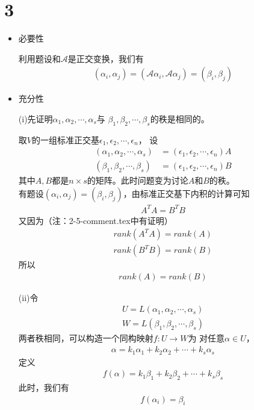\documentclass{article}
\begin{document}
\section*{3}

\begin{itemize}
  \item 必要性

        利用题设和$\mathscr{A}$是正交变换，我们有
        \begin{align*}
          (\alpha_i, \alpha_j) = (\mathscr{A} \alpha_i, \mathscr{A} \alpha_j) = (\beta_i, \beta_j)
        \end{align*}

  \item 充分性

        (i)先证明$\alpha_1, \alpha_2, \cdots, \alpha_s$与
        $\beta_1, \beta_2, \cdots, \beta_s$的秩是相同的。

        取$V$的一组标准正交基$\epsilon_1, \epsilon_2, \cdots, \epsilon_n$，
        设
        \begin{align*}
          (\alpha_1, \alpha_2, \cdots, \alpha_s) & = (\epsilon_1, \epsilon_2, \cdots, \epsilon_n) A \\
          (\beta_1, \beta_2, \cdots, \beta_s)    & = (\epsilon_1, \epsilon_2, \cdots, \epsilon_n) B
        \end{align*}
        其中$A, B$都是$n \times s$的矩阵。此时问题变为讨论$A$和$B$的秩。\\
        有题设$(\alpha_i, \alpha_j) = (\beta_i, \beta_j)$，由标准正交基下内积的计算可知
        \begin{align*}
          A^T A = B^T B
        \end{align*}
        又因为（注：2-5-comment.tex中有证明）
        \begin{align*}
          rank(A^T A) = rank(A) \\
          rank(B^T B) = rank(B)
        \end{align*}
        所以
        \begin{align*}
          rank(A) = rank(B)
        \end{align*}

        (ii)令
        \begin{align*}
          U = L(\alpha_1, \alpha_2, \cdots, \alpha_s) \\
          W = L(\beta_1, \beta_2, \cdots, \beta_s)
        \end{align*}
        两者秩相同，可以构造一个同构映射$f: U \to W$为
        对任意$\alpha \in U$，
        \begin{align*}
          \alpha = k_1 \alpha_1 + k_2 \alpha_2 + \cdots + k_s \alpha_s
        \end{align*}
        定义
        \begin{align*}
          f(\alpha) = k_1 \beta_1 + k_2 \beta_2 + \cdots + k_s \beta_s
        \end{align*}
        此时，我们有
        \begin{align*}
          f(\alpha_i) = \beta_i
        \end{align*}


\end{itemize}
\end{document}
